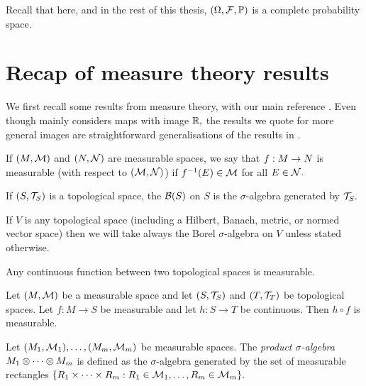 Recall that here, and in the rest of this thesis, $\OFP$ is a complete probability space.

\section{Recap of measure theory results}

We first recall some results from measure theory, with our main reference \cite{Bo:07}. Even though \cite{Bo:07} mainly considers maps with image $\mathbb R,$ the results we quote for more general images are straightforward generalisations of the results in \cite{Bo:07}.

\begin{definition}\label{def:meas}
If $(M,\mathcal M)$ and $(N,\mathcal N)$ are measurable spaces, we say that $f:M\rightarrow N$ is measurable (with respect to $(\mathcal M,\mathcal N)$) if $f^{-1}(E) \in \mathcal M$ for all $E \in \mathcal N.$
\end{definition}



\label{def:borelsigma}
If $(S,\mathcal T_{S})$ is a topological space, the  $\Borel{S}$ on $S$ is the $\sigma$-algebra generated by $\mathcal T_{S}.$
\ede


If $V$ is any topological space (including a Hilbert, Banach, metric, or normed vector space) then we will take always the Borel $\sigma$-algebra on $V$ unless stated otherwise.


 \label{lem:contmeas}
Any continuous function between two topological spaces is measurable.
\ele





\label{lem:contplusmeas}
Let $(M,\mathcal M)$ be a measurable space and let $\mleft(S,\TS\mright)$ and $\mleft(T,\TopT\mright)$ be topological spaces. Let $f:M \rightarrow S$ be measurable and let $h : S \rightarrow T$ be continuous. Then $h \circ f$ is measurable.
\ele

\label{def:prodsigma}
Let $\mleft(\M_1,\FM_1\mright),\ldots,\mleft(\M_m,\FM_m\mright)$ be measurable spaces. The \emph{product $\sigma$-algebra} $M_1\otimes\cdots\otimes M_m$ is defined as the $\sigma$-algebra generated by the set of measurable rectangles
$%
\set{R_{1} \times \cdots \times R_m  \st R_{1} \in \FM_1, \ldots, R_m \in \FM_m}.
$
\ede

